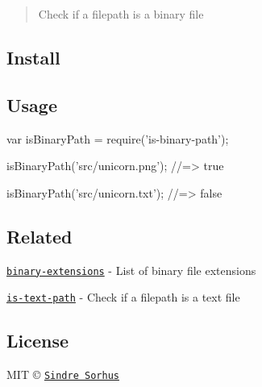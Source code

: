 \begin{quote}
Check if a filepath is a binary file \end{quote}


\subsection*{Install}




\subsection*{Usage}


\begin{DoxyCode}
var isBinaryPath = require('is-binary-path');

isBinaryPath('src/unicorn.png');
//=> true

isBinaryPath('src/unicorn.txt');
//=> false
\end{DoxyCode}


\subsection*{Related}


\begin{DoxyItemize}
\item \href{https://github.com/sindresorhus/binary-extensions}{\tt {\ttfamily binary-\/extensions}} -\/ List of binary file extensions
\item \href{https://github.com/sindresorhus/is-text-path}{\tt {\ttfamily is-\/text-\/path}} -\/ Check if a filepath is a text file
\end{DoxyItemize}

\subsection*{License}

M\+IT © \href{http://sindresorhus.com}{\tt Sindre Sorhus} 